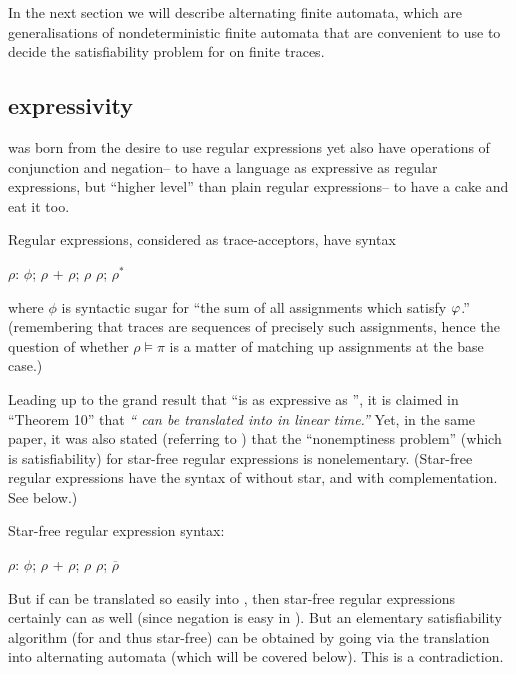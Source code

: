 In the next section we will describe alternating finite automata, which are generalisations of nondeterministic finite automata that are convenient to use to decide the satisfiability problem for \ldlf on finite traces.

\subsection{\ldlf expressivity}

\ldlf was born from the desire to use regular expressions yet also have operations
of conjunction and negation-- to have a language as expressive as regular expressions,
but ``higher level'' than plain regular expressions-- to have a cake and eat it too.

Regular expressions, considered as trace-acceptors, have syntax

\begin{myGrammar}
$\rho$: $\phi$; $\rho$ + $\rho$; $\rho$ \semi $\rho$; $\rho^*$
\end{myGrammar}

where $\phi$ is syntactic sugar for
``the sum of all assignments which satisfy $\varphi$.''
(remembering that traces are sequences of precisely
such assignments, hence the question of whether $\rho \models \pi$
is a matter of matching up assignments at the base case.)

Leading up to the grand result that ``\ldlf is as expressive as '',
it is claimed in \cite{ldlf} ``Theorem 10'' that
\emph{`` can be translated into \ldlf in linear time.''}
Yet, in the same paper, it was also stated (referring to \cite{nonelem_starfree})
that the ``nonemptiness problem'' (which is satisfiability) for star-free regular expressions is nonelementary.
(Star-free regular expressions have the syntax of  without star, and with
complementation. See below.)

Star-free regular expression syntax:
\begin{myGrammar}
$\rho$: $\phi$; $\rho$ + $\rho$; $\rho$ \semi $\rho$; $\overline{\rho}$
\end{myGrammar}

But if  can be translated so easily into \ldlf, then star-free regular expressions
certainly can as well (since negation is easy in \ldlf).
But an elementary satisfiability algorithm (for \ldlf and thus star-free)
can be obtained by going via the translation into alternating automata
(which will be covered below).
This is a contradiction.

